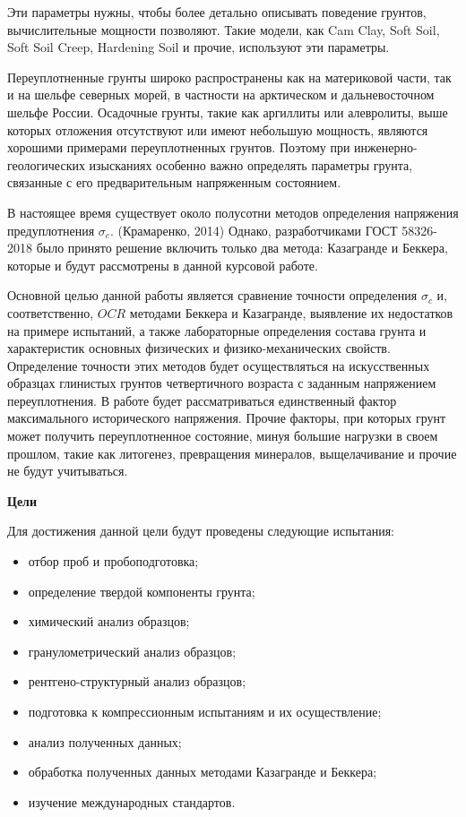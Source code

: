 Эти параметры нужны, чтобы более детально описывать поведение грунтов, вычислительные мощности позволяют. 
Такие модели, как Cam Clay, Soft Soil, Soft Soil Creep, Hardening Soil и прочие, используют эти параметры. 

Переуплотненные грунты широко распространены как на материковой части, так и на шельфе северных морей, в частности на арктическом и дальневосточном шельфе России.
Осадочные грунты, такие как аргиллиты или алевролиты, выше которых отложения отсутствуют или имеют небольшую мощность, являются хорошими примерами переуплотненных грунтов.
Поэтому при инженерно-геологических изысканиях особенно важно определять параметры грунта, связанные с его предварительным напряженным состоянием.

В настоящее время существует около полусотни  методов определения напряжения предуплотнения $\sigma_c$. (Крамаренко, 2014) \cite{kram2014}
Однако, разработчиками ГОСТ 58326-2018 было принято решение включить только два метода: Казагранде и Беккера, которые и будут рассмотрены в данной курсовой работе. 

Основной целью данной работы является сравнение точности определения $\sigma_c$ и, соответственно, $OCR$ методами Беккера и Казагранде, выявление их недостатков на примере испытаний, а также лабораторные определения состава грунта и характеристик основных физических и физико-механических свойств. 
Определение точности этих методов будет осуществляться на искусственных образцах глинистых грунтов четвертичного возраста с заданным напряжением переуплотнения. 
В работе будет рассматриваться единственный фактор максимального исторического напряжения. Прочие факторы, при которых грунт может получить переуплотненное состояние, минуя большие нагрузки в своем прошлом, такие как литогенез, превращения минералов, выщелачивание и прочие не будут учитываться.

\textbf{Цели}

Для достижения данной цели будут проведены следующие испытания:
\begin{itemize}
    \item отбор проб и пробоподготовка; 
    \item определение твердой компоненты грунта;
    \item химический анализ образцов;
    \item гранулометрический анализ образцов;
    \item рентгено-структурный анализ образцов;
    \item подготовка к компрессионным испытаниям и их осуществление;
    \item анализ полученных данных;
    \item обработка полученных данных методами Казагранде и Беккера;
    \item изучение международных стандартов.
\end{itemize}

